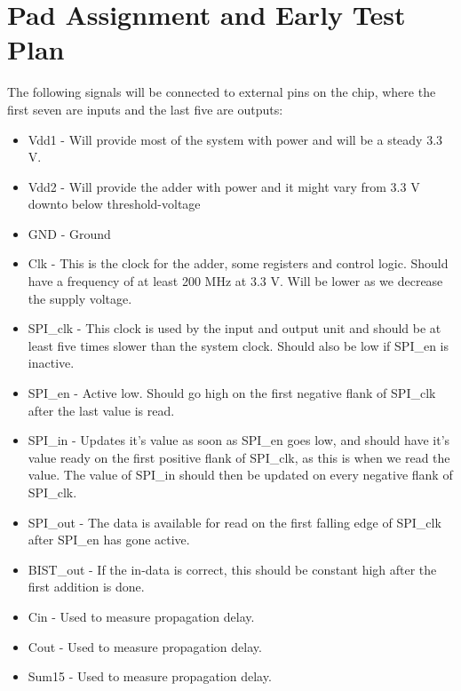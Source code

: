 \section{Pad Assignment and Early Test Plan}
The following signals will be connected to external pins on the chip, where the first seven are inputs and the last five are outputs:
\begin{itemize}
	\item Vdd1 - Will provide most of the system with power and will be a steady 3.3 V.
	\item Vdd2 - Will provide the adder with power and it might vary from 3.3 V downto below threshold-voltage
	\item GND - Ground
	\item Clk - This is the clock for the adder, some registers and control logic. Should have a frequency of at least 200 MHz at 3.3 V. Will be lower as we decrease the supply voltage.
	\item SPI\_clk - This clock is used by the input and output unit and should be at least five times slower than the system clock. Should also be low if SPI\_en is inactive.
	\item SPI\_en - Active low. Should go high on the first negative flank of SPI\_clk after the last value is read.
	\item SPI\_in - Updates it's value as soon as SPI\_en goes low, and should have it's value ready on the first positive flank of SPI\_clk, as this is when we read the value. The value of SPI\_in should then be updated on every negative flank of SPI\_clk.
	\item SPI\_out - The data is available for read on the first falling edge of SPI\_clk after SPI\_en has gone active.
	\item BIST\_out - If the in-data is correct, this should be constant high after the first addition is done. 
	\item Cin - Used to measure propagation delay.
	\item Cout - Used to measure propagation delay.
	\item Sum15 - Used to measure propagation delay.
\end{itemize}
 
